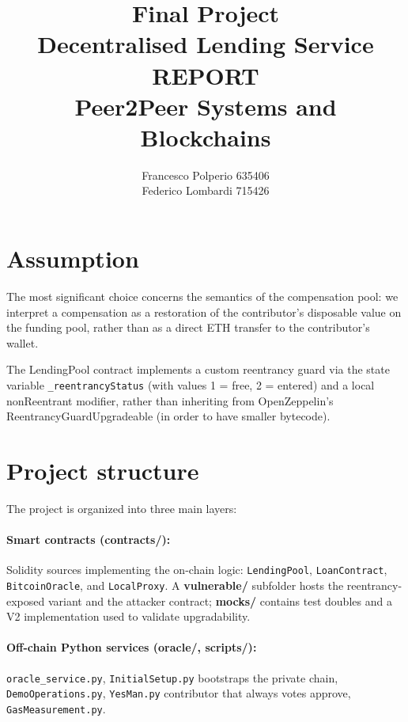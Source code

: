 \documentclass{report}
\title{\textbf{Final Project \\ Decentralised Lending Service}\\[0.7em]
\large REPORT\\[0.5em]
\large Peer2Peer Systems and Blockchains }
\author{Francesco Polperio 635406 \\ Federico Lombardi 715426}
\date{}
\begin{document}
\maketitle
\thispagestyle{empty} %
\clearpage            %

\setcounter{page}{1}  %

\section*{Assumption}
The most significant choice concerns the semantics of the compensation pool: we interpret a compensation as a restoration of the contributor's disposable value on the funding pool, rather than as a direct ETH transfer to the contributor's wallet.

The LendingPool contract implements a custom reentrancy guard via the state variable \texttt{\_reentrancyStatus} (with values 1 = free, 2 = entered) and a local nonReentrant modifier, rather than inheriting from OpenZeppelin's ReentrancyGuardUpgradeable (in order to have smaller bytecode).

\section*{Project structure}
The project is organized into three main layers:
\paragraph*{Smart contracts (contracts/):} Solidity sources implementing the on-chain logic: \texttt{LendingPool}, \texttt{LoanContract}, \texttt{BitcoinOracle}, and \texttt{LocalProxy}. A \textbf{vulnerable/} subfolder hosts the reentrancy-exposed variant and the attacker contract; \textbf{mocks/} contains test doubles and a V2 implementation used to validate upgradability.

\paragraph*{Off-chain Python services (oracle/, scripts/):} \texttt{oracle\_service.py}, \texttt{InitialSetup.py} bootstraps the private chain, \texttt{DemoOperations.py}, \texttt{YesMan.py} contributor that always votes approve, \texttt{GasMeasurement.py}.
\end{document}
